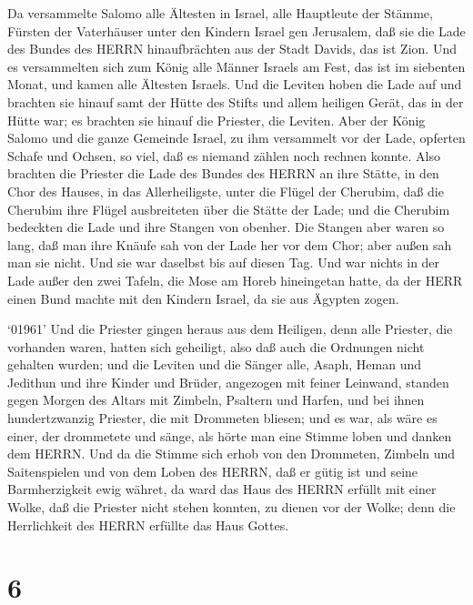  Da versammelte Salomo alle Ältesten in Israel, alle
Hauptleute der Stämme, Fürsten der Vaterhäuser unter den Kindern Israel
gen Jerusalem, daß sie die Lade des Bundes des HERRN hinaufbrächten aus
der Stadt Davids, das ist Zion.  Und es versammelten sich
zum König alle Männer Israels am Fest, das ist im siebenten Monat,
 und kamen alle Ältesten Israels. Und die Leviten hoben die
Lade auf  und brachten sie hinauf samt der Hütte des Stifts
und allem heiligen Gerät, das in der Hütte war; es brachten sie hinauf
die Priester, die Leviten.  Aber der König Salomo und die
ganze Gemeinde Israel, zu ihm versammelt vor der Lade, opferten Schafe
und Ochsen, so viel, daß es niemand zählen noch rechnen konnte.
 Also brachten die Priester die Lade des Bundes des HERRN an
ihre Stätte, in den Chor des Hauses, in das Allerheiligste, unter die
Flügel der Cherubim,  daß die Cherubim ihre Flügel
ausbreiteten über die Stätte der Lade; und die Cherubim bedeckten die
Lade und ihre Stangen von obenher.  Die Stangen aber waren
so lang, daß man ihre Knäufe sah von der Lade her vor dem Chor; aber
außen sah man sie nicht. Und sie war daselbst bis auf diesen Tag.
 Und war nichts in der Lade außer den zwei Tafeln, die Mose
am Horeb hineingetan hatte, da der HERR einen Bund machte mit den
Kindern Israel, da sie aus Ägypten zogen.

 `01961' Und die Priester gingen heraus aus dem Heiligen,
denn alle Priester, die vorhanden waren, hatten sich geheiligt, also daß
auch die Ordnungen nicht gehalten wurden;  und die Leviten
und die Sänger alle, Asaph, Heman und Jedithun und ihre Kinder und
Brüder, angezogen mit feiner Leinwand, standen gegen Morgen des Altars
mit Zimbeln, Psaltern und Harfen, und bei ihnen hundertzwanzig Priester,
die mit Drommeten bliesen;  und es war, als wäre es einer,
der drommetete und sänge, als hörte man eine Stimme loben und danken dem
HERRN. Und da die Stimme sich erhob von den Drommeten, Zimbeln und
Saitenspielen und von dem Loben des HERRN, daß er gütig ist und seine
Barmherzigkeit ewig währet, da ward das Haus des HERRN erfüllt mit einer
Wolke,  daß die Priester nicht stehen konnten, zu dienen
vor der Wolke; denn die Herrlichkeit des HERRN erfüllte das Haus Gottes.

\hypertarget{section-5}{%
\section{6}\label{section-5}}

